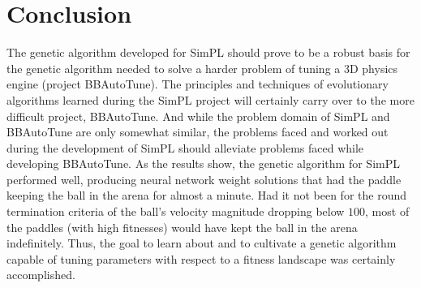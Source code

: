 \documentclass[a4paper,10pt]{article}
\begin{document}





\section{Conclusion}

The genetic algorithm developed for SimPL should prove to be a robust basis for the genetic algorithm needed to solve a harder problem of tuning a 3D physics engine (project BBAutoTune). The principles and techniques of evolutionary algorithms learned during the SimPL project will certainly carry over to the more difficult project, BBAutoTune. And while the problem domain of SimPL and BBAutoTune are only somewhat similar, the problems faced and worked out during the development of SimPL should alleviate problems faced while developing BBAutoTune. As the results show, the genetic algorithm for SimPL performed well, producing neural network weight solutions that had the paddle keeping the ball in the arena for almost a minute. Had it not been for the round termination criteria of the ball's velocity magnitude dropping below $100$, most of the paddles (with high fitnesses) would have kept the ball in the arena indefinitely. Thus, the goal to learn about and to cultivate a genetic algorithm capable of tuning parameters with respect to a fitness landscape was certainly accomplished.     



\end{document}

